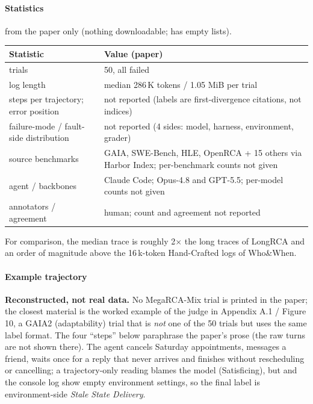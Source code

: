 \paragraph{Statistics} from the paper only (nothing downloadable;  has empty lists).\par\nobreak\vspace{1pt}
\noindent\begin{minipage}[t]{\linewidth}\vspace{0pt}\small
\begin{tabular}{@{}ll@{}}\toprule
Statistic & Value (paper)\\\midrule
trials & 50, all failed\\
log length & median 286\,K tokens / 1.05 MiB per trial\\
steps per trajectory; error position & not reported (labels are first-divergence citations, not indices)\\
failure-mode / fault-side distribution & not reported (4 sides: model, harness, environment, grader)\\
source benchmarks & GAIA, SWE-Bench, HLE, OpenRCA + 15 others via Harbor Index; per-benchmark counts not given\\
agent / backbones & Claude Code; Opus-4.8 and GPT-5.5; per-model counts not given\\
annotators / agreement & human; count and agreement not reported\\\bottomrule
\end{tabular}

\smallskip For comparison, the median trace is roughly 2$\times$ the long traces of LongRCA and an order of magnitude above the 16\,k-token Hand-Crafted logs of Who\&When.
\end{minipage}

\paragraph{Example trajectory} \textbf{Reconstructed, not real data.} No MegaRCA-Mix trial is printed in the paper; the closest material is the worked example of the judge in Appendix A.1 / Figure 10, a GAIA2 (adaptability) trial  that is \emph{not} one of the 50 trials but uses the same label format. The four ``steps'' below paraphrase the paper's prose (the raw turns are not shown there). The agent cancels Saturday appointments, messages a friend, waits once for a reply that never arrives and finishes without rescheduling or cancelling; a trajectory-only reading blames the model (Satisficing), but  and the console log show empty environment settings, so the final label is environment-side \emph{Stale State Delivery}.


